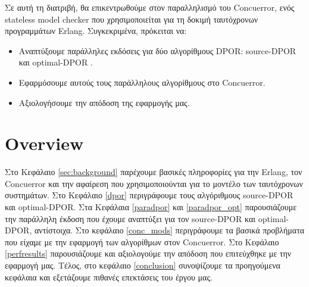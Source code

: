 Σε αυτή τη διατριβή, θα επικεντρωθούμε στον παραλληλισμό του Concuerror, ενός stateless model checker
που χρησιμοποιείται για τη δοκιμή ταυτόχρονων προγραμμάτων Erlang. Συγκεκριμένα, πρόκειται να:

\begin{itemize}
\item Αναπτύξουμε παράλληλες εκδόσεις για δύο αλγορίθμους DPOR: source-DPOR \cite{AbdullaAronisJohnssonSagonasDPOR2014} και optimal-DPOR \cite{AbdullaAronisJohnssonSagonasDPOR2014}.
\item Εφαρμόσουμε αυτούς τους παράλληλους αλγορίθμους στο Concuerror.
\item Αξιολογήσουμε την απόδοση της εφαρμογής μας.

\end{itemize}

\section{Overview}

Στο Κεφάλαιο \ref{sec:background} παρέχουμε βασικές πληροφορίες για την Erlang, τον Concuerror και την αφαίρεση που χρησιμοποιούνται για το μοντέλο των ταυτόχρονων συστημάτων. Στο Κεφάλαιο \ref{dpor} περιγράφουμε τους αλγόριθμους source-DPOR και optimal-DPOR. Στα Κεφάλαια \ref{paradpor} και \ref{paradpor_opt} παρουσιάζουμε την παράλληλη έκδοση που έχουμε αναπτύξει για τον source-DPOR και optimal-DPOR, αντίστοιχα. Στο κεφάλαιο
\ref{conc_mods} περιγράφουμε τα βασικά προβλήματα που είχαμε με την εφαρμογή των αλγορίθμων στον Concuerror.
Στο Κεφάλαιο \ref{perfresults} παρουσιάζουμε και αξιολογούμε την απόδοση που επιτεύχθηκε με την εφαρμογή μας. Τέλος, στο κεφάλαιο \ref{conclusion}
συνοψίζουμε τα προηγούμενα κεφάλαια και εξετάζουμε πιθανές επεκτάσεις του έργου μας.
